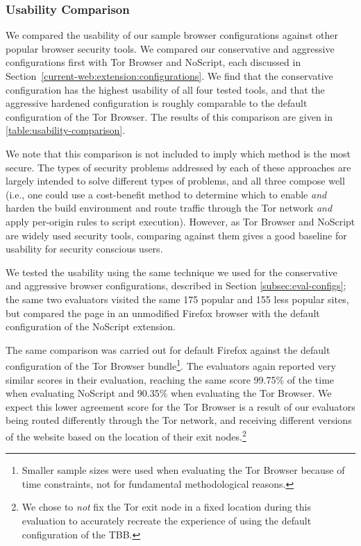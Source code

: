 \subsubsection{Usability Comparison}
\label{current-web:extension:usability-comparison}



We compared the usability of our sample browser configurations against
other popular browser security tools.  We compared our conservative and
aggressive configurations first with Tor Browser and NoScript, each discussed
in Section~\ref{current-web:extension:configurations}.  We find that the conservative
configuration has the highest usability of all four tested tools, and that
the aggressive hardened configuration is roughly comparable to the default
configuration of the Tor Browser.  The results of this comparison are given in
\ref{table:usability-comparison}.

We note that this comparison is not included to imply which method is the most
secure.  The types of security problems addressed by each of these approaches
are largely intended to solve different types of problems, and all three compose
well (i.e., one could use a cost-benefit method to determine which \WASs to enable
\textit{and} harden the build environment and route traffic through the Tor
network \textit{and} apply per-origin rules to script execution).  However, as Tor Browser and NoScript are widely used security tools, comparing against them gives a good baseline for usability for security conscious users.

We tested the usability using the same technique we used for the conservative
and aggressive browser configurations, described in Section
\ref{subsec:eval-configs}; the same two evaluators visited the
same 175 popular and 155 less popular sites, but compared the page in
an unmodified Firefox browser with the default configuration of the NoScript
extension.

The same comparison was carried out for default Firefox against
the default configuration of the Tor Browser bundle\footnote{Smaller sample
sizes were used when evaluating the Tor Browser because of time constraints,
not for fundamental methodological reasons.}.  The evaluators again
reported very similar scores in their evaluation, reaching the same score
99.75\% of the time when evaluating NoScript and 90.35\% when evaluating the
Tor Browser.  We expect this lower agreement score for the Tor Browser is
a result of our evaluators being routed differently through the Tor network, and
receiving different versions of the website based on the location of their
exit nodes.\footnote{We chose to \emph{not} fix the Tor exit node in a fixed
location during this evaluation to accurately recreate the experience of using
the default configuration of the TBB.}

